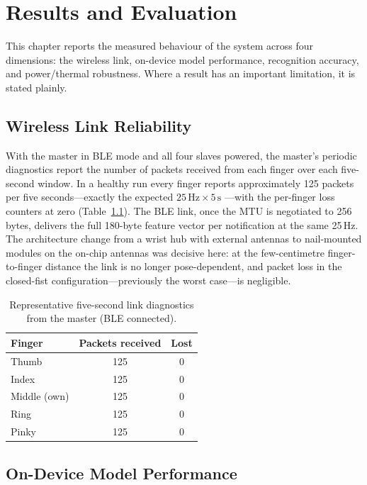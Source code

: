 \chapter{Results and Evaluation}

This chapter reports the measured behaviour of the system across four
dimensions: the wireless link, on-device model performance, recognition
accuracy, and power/thermal robustness. Where a result has an important
limitation, it is stated plainly.

\section{Wireless Link Reliability}

With the master in BLE mode and all four slaves powered, the master's periodic
diagnostics report the number of packets received from each finger over each
five-second window. In a healthy run every finger reports approximately 125
packets per five seconds—exactly the expected $25\,\text{Hz} \times 5\,\text{s}$
—with the per-finger loss counters at zero (Table~\ref{tab:rf}). The BLE link,
once the MTU is negotiated to 256 bytes, delivers the full 180-byte feature
vector per notification at the same 25\,Hz. The architecture change from a
wrist hub with external antennas to nail-mounted modules on the on-chip
antennas was decisive here: at the few-centimetre finger-to-finger distance the
link is no longer pose-dependent, and packet loss in the closed-fist
configuration—previously the worst case—is negligible.

\begin{table}[!htbp]
\centering
\caption{\label{tab:rf}Representative five-second link diagnostics from the
master (BLE connected).}
\begin{tabular}{lcc}
\toprule
Finger & Packets received & Lost \\
\midrule
Thumb  & 125 & 0 \\
Index  & 125 & 0 \\
Middle (own) & 125 & 0 \\
Ring   & 125 & 0 \\
Pinky  & 125 & 0 \\
\bottomrule
\end{tabular}
\end{table}

\section{On-Device Model Performance}

